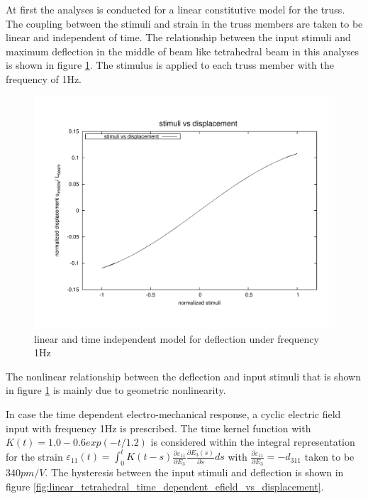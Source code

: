 At first the analyses is conducted for a linear constitutive model for the truss.
The coupling between the stimuli and strain in the truss members are taken to be linear and independent of time.
The relationship between the input stimuli and maximum deflection in the middle of beam like tetrahedral beam in this analyses is shown in figure \ref{fig:linear_static_stimuli_vs_displacement}.
The stimulus is applied to each truss member with the frequency of 1Hz.

\begin{figure} 
\centering
\includegraphics[width=5.0in]{./chap_5_active_trusses/images_non_linear_time_dependent_constitutive_equatio/linear_static_stimuli_vs_displacement.pdf}
\caption{linear and time independent model for deflection under frequency 1Hz}
\label{fig:linear_static_stimuli_vs_displacement}
\end{figure} 

The nonlinear relationship between the deflection and input stimuli that is shown in figure \ref {fig:linear_static_stimuli_vs_displacement} is mainly due to geometric nonlinearity.

In case the time dependent electro-mechanical response, a cyclic electric field input with frequency 1Hz is prescribed.
The time kernel function with 
$K(t)=1.0-0.6 exp(-t/1.2)$ is considered within the integral representation for the strain 
$\varepsilon_{11}(t)=\int_0^t
K(t-s)\frac{\partial \varepsilon_{11}}{\partial E_3}\frac{\partial
E_3(s)}{\partial s} ds$ 
with 
$\frac{\partial \varepsilon_{11}}{\partial
E_3}=-d_{311}$ 
taken to be 
$340 pm/V$.
The hysteresis between the input stimuli and deflection is shown in figure \ref{fig:linear_tetrahedral_time_dependent_efield_vs_displacement}.

